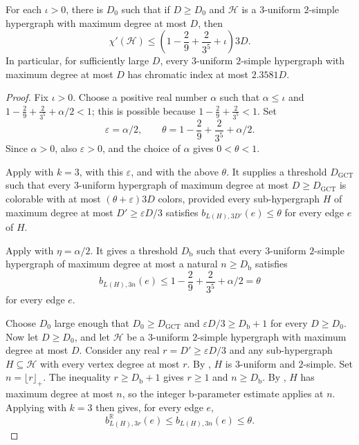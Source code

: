 \begin{theorem}
For each $\iota>0$, there is $D_0$ such that if $D\ge D_0$ and
$\mathcal H$ is a $3$-uniform $2$-simple hypergraph with maximum degree at
most $D$, then
\[
\chi'(\mathcal H)\le
\left(1-\frac29+\frac{2}{3^5}+\iota\right)3D.
\]
In particular, for sufficiently large $D$, every $3$-uniform $2$-simple
hypergraph with maximum degree at most $D$ has chromatic index at most
$2.3581D$.
\end{theorem}
\begin{proof}
Fix $\iota>0$.  Choose a positive real number $\alpha$ such that
$\alpha\le\iota$ and
$1-\frac29+\frac{2}{3^5}+\alpha/2<1$; this is possible because
$1-\frac29+\frac{2}{3^5}<1$.  Set
\[
\varepsilon=\alpha/2,\qquad
\theta=1-\frac29+\frac{2}{3^5}+\alpha/2 .
\]
Since $\alpha>0$, also $\varepsilon>0$, and the choice of $\alpha$ gives
$0<\theta<1$.

Apply  with $k=3$, with this
$\varepsilon$, and with the above $\theta$.  It supplies a threshold
$D_{\mathrm{GCT}}$ such that every $3$-uniform hypergraph of maximum degree at
most $D\ge D_{\mathrm{GCT}}$ is colorable with at most
$(\theta+\varepsilon)3D$ colors, provided every sub-hypergraph $H$ of maximum
degree at most $D'\ge \varepsilon D/3$ satisfies
$b_{L(H),3D'}(e)\le\theta$ for every edge $e$ of $H$.

Apply  with
$\eta=\alpha/2$.  It gives a threshold $D_{\mathrm b}$ such that every
$3$-uniform $2$-simple hypergraph of maximum degree at most a natural $n\ge
D_{\mathrm b}$ satisfies
\[
b_{L(H),3n}(e)\le 1-\frac29+\frac{2}{3^5}+\alpha/2=\theta
\]
for every edge $e$.

Choose $D_0$ large enough that $D_0\ge D_{\mathrm{GCT}}$ and
$\varepsilon D/3\ge D_{\mathrm b}+1$ for every $D\ge D_0$.  Now let
$D\ge D_0$, and let $\mathcal H$ be a $3$-uniform $2$-simple hypergraph with
maximum degree at most $D$.  Consider any real $r=D'\ge \varepsilon D/3$ and
any sub-hypergraph $H\subseteq\mathcal H$ with every vertex degree at most $r$.
By , $H$ is $3$-uniform and $2$-simple.
Set $n=\lfloor r\rfloor_+$.  The inequality $r\ge D_{\mathrm b}+1$ gives
$r\ge1$ and $n\ge D_{\mathrm b}$.  By ,
$H$ has maximum degree at most $n$, so the integer b-parameter estimate
applies at $n$.  Applying 
with $k=3$ then gives, for every edge $e$,
\[
b^{\mathbb R}_{L(H),3r}(e)\le b_{L(H),3n}(e)\le\theta.
\]


\end{proof}
